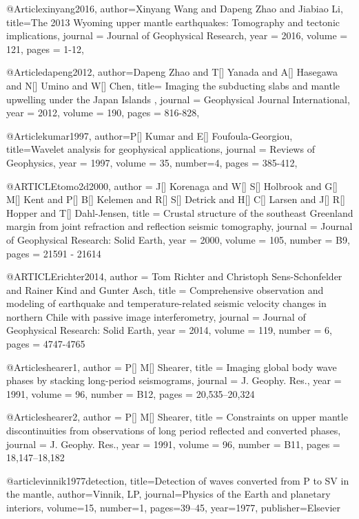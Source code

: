 @Article{xinyang2016,
  author={Xinyang Wang and Dapeng Zhao and Jiabiao Li},
  title={The 2013 Wyoming upper mantle earthquakes: Tomography and tectonic implications},
  journal = 	 {Journal of Geophysical Research},
  year = 	 2016,
  volume =	 121,
  pages =	 {1-12},
}

@Article{dapeng2012,
  author={Dapeng Zhao and T[] Yanada and A[] Hasegawa and N[] Umino and W[] Chen},
  title={ Imaging the subducting slabs and mantle upwelling under the Japan Islands },
  journal = 	 {Geophysical Journal International},
  year = 	 2012,
  volume =	 190,
  pages =	 {816-828},
}


@Article{kumar1997,
  author={P[] Kumar and E[] Foufoula-Georgiou},
  title={Wavelet analysis for geophysical applications},
  journal = 	 {Reviews of Geophysics},
  year = 	 1997,
  volume =	 35,
  number=4,
  pages =	 {385-412},
}

@ARTICLE{tomo2d2000,
  author = {J[] Korenaga and W[] S[] Holbrook and G[] M[] Kent and P[] B[] Kelemen and R[] S[] Detrick and H[] C[] Larsen and J[] R[] Hopper and T[] Dahl-Jensen},
  title = {Crustal structure of the southeast Greenland margin from joint refraction and reflection seismic tomography},
  journal = {Journal of Geophysical Research: Solid Earth},
  year = {2000},
  volume = {105},
  number = B9,
  pages = {21591 - 21614}
}

@ARTICLE{richter2014,
  author = {Tom Richter and Christoph Sens-Schonfelder and  Rainer Kind and Gunter Asch},
  title = {Comprehensive observation and modeling of earthquake and temperature-related seismic velocity changes in northern Chile with passive image interferometry},
  journal = {Journal of Geophysical Research: Solid Earth},
  year = {2014},
  volume = {119},
  number = 6,
  pages = {4747-4765}
}



@Article{shearer1,
  author = 	 {P[] M[] Shearer},
  title = 	 {Imaging global body wave phases by stacking long-period seismograms},
  journal = 	 {J. Geophy. Res.},
  year = 	 1991,
  volume = 	 96,
  number = 	 {B12},
  pages = 	 {20,535--20,324}}

@Article{shearer2,
  author = 	 {P[] M[] Shearer},
  title = 	 {Constraints on upper mantle discontinuities from observations
	of long period reflected and converted phases},
  journal = 	 {J. Geophy. Res.},
  year = 	 1991,
  volume = 	 96,
  number = 	 {B11},
  pages = 	 {18,147--18,182}}


@article{vinnik1977detection,
  title={Detection of waves converted from P to SV in the mantle},
  author={Vinnik, LP},
  journal={Physics of the Earth and planetary interiors},
  volume={15},
  number={1},
  pages={39--45},
  year={1977},
  publisher={Elsevier}
}


